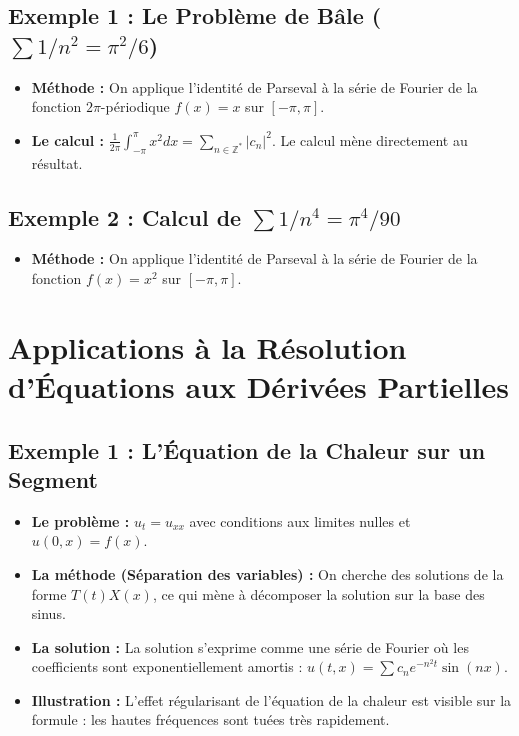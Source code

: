 \documentclass[12pt, a4paper, parskip=full]{report}
\theoremstyle{agregstyle}
\begin{document}
\subsection{Exemple 1 : Le Problème de Bâle ($\sum 1/n^2 = \pi^2/6$)}
\begin{itemize}
    \item \textbf{Méthode :} On applique l'identité de Parseval à la série de Fourier de la fonction $2\pi$-périodique $f(x)=x$ sur $[-\pi, \pi]$.
    \item \textbf{Le calcul :} $\frac{1}{2\pi}\int_{-\pi}^{\pi} x^2 dx = \sum_{n \in \mathbb{Z}^*} |c_n|^2$. Le calcul mène directement au résultat.
\end{itemize}
\subsection{Exemple 2 : Calcul de $\sum 1/n^4 = \pi^4/90$}
\begin{itemize}
    \item \textbf{Méthode :} On applique l'identité de Parseval à la série de Fourier de la fonction $f(x)=x^2$ sur $[-\pi, \pi]$.
\end{itemize}

\section{Applications à la Résolution d'Équations aux Dérivées Partielles}
\subsection{Exemple 1 : L'Équation de la Chaleur sur un Segment}
\begin{itemize}
    \item \textbf{Le problème :} $u_t = u_{xx}$ avec conditions aux limites nulles et $u(0,x)=f(x)$.
    \item \textbf{La méthode (Séparation des variables) :} On cherche des solutions de la forme $T(t)X(x)$, ce qui mène à décomposer la solution sur la base des sinus.
    \item \textbf{La solution :} La solution s'exprime comme une série de Fourier où les coefficients sont exponentiellement amortis : $u(t,x) = \sum c_n e^{-n^2 t} \sin(nx)$.
    \item \textbf{Illustration :} L'effet régularisant de l'équation de la chaleur est visible sur la formule : les hautes fréquences sont tuées très rapidement.
\end{itemize}
\end{document}
